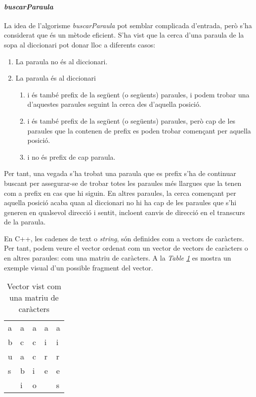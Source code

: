 \documentclass[titlepage]{article}
\begin{document}
\paragraph{\textit{buscarParaula}}
La idea de l'algorisme \textit{buscarParaula} pot semblar complicada d'entrada, però s'ha considerat que és un mètode eficient. S'ha vist que la cerca d'una paraula de la sopa al diccionari pot donar lloc a diferents casos:
\begin{enumerate}
  \item La paraula no és al diccionari.
  \item La paraula és al diccionari
    \begin{enumerate}
    \item i és també prefix de la següent (o següents) paraules, i podem trobar una d'aquestes paraules seguint la cerca des d'aquella posició.
    \item i és també prefix de la següent (o següents) paraules, però cap de les paraules que la contenen de prefix es poden trobar començant per aquella posició.
    \item i no és prefix de cap paraula.
    \end{enumerate}
\end{enumerate}
Per tant, una vegada s'ha trobat una paraula que es prefix s'ha de continuar buscant per assegurar-se de trobar totes les paraules més llargues que la tenen com a prefix en cas que hi siguin. En altres paraules, la cerca començant per aquella posició acaba quan al diccionari no hi ha cap de les paraules que s'hi generen en qualsevol direcció i sentit, incloent canvis de direcció en el transcurs de la paraula.\newline\par

En C++, les cadenes de text o \textit{string}, són definides com a vectors de caràcters. Per tant, podem veure el vector ordenat com un vector de vectors de caràcters o en altres paraules: com una matriu de caràcters. A la \textit{Table \ref{fig:sortedVector1}} es mostra un exemple visual d'un possible fragment del vector. \newline
\begin{table}[H]
\begin{center}
\begin{tabular}{l|l|l|l|l|}
\hline
\multicolumn{1}{|l|}{a} & a & a & a & a \\
\multicolumn{1}{|l|}{b} & c & c & i & i \\
\multicolumn{1}{|l|}{u} & a & c & r & r \\
\multicolumn{1}{|l|}{s} & b & i & e & e \\ \cline{1-1} \cline{4-4}
                        & i & o &   & s \\ \cline{2-3} \cline{5-5} 
\end{tabular}
\caption{Vector vist com una matriu de caràcters}
            \label{fig:sortedVector1}
\end{center}
\end{table}
\end{document}
